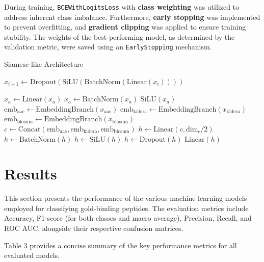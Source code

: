 \documentclass{article}
\begin{document}
During training, \texttt{BCEWithLogitsLoss} with \textbf{class weighting} was utilized to address inherent class imbalance. Furthermore, \textbf{early stopping} was implemented to prevent overfitting, and \textbf{gradient clipping} was applied to ensure training stability. The weights of the best-performing model, as determined by the validation metric, were saved using an \texttt{EarlyStopping} mechanism.

\begin{algorithm}
\caption{Siamese-like Architecture}
\begin{algorithmic}[1]
\Statex
{}
    \State $x_{i+1} \gets \text{Dropout}(\text{SiLU}(\text{BatchNorm}(\text{Linear}(x_{i}))))$
    
    \State $x_a \gets \text{Linear}(x_a)$
    \State $x_a \gets \text{BatchNorm}(x_a)$
    \State \Return $\text{SiLU}(x_a)$
\EndFunction
\Statex
{}
    \State $\text{emb}_{\text{aac}} \gets \text{EmbeddingBranch}(x_{\text{aac}})$
    \State $\text{emb}_{\text{kidera}} \gets \text{EmbeddingBranch}(x_{\text{kidera}})$
    \State $\text{emb}_{\text{blosum}} \gets \text{EmbeddingBranch}(x_{\text{blosum}})$
    \State $c \gets \text{Concat}(\text{emb}_{\text{aac}}, \text{emb}_{\text{kidera}}, \text{emb}_{\text{blosum}})$
    \State $h \gets \text{Linear}(c, \text{dim}_{c}/2)$
    \State $h \gets \text{BatchNorm}(h)$
    \State $h \gets \text{SiLU}(h)$
    \State $h \gets \text{Dropout}(h)$
    \State \Return $\text{Linear}(h)$
\EndFunction
\end{algorithmic}
\end{algorithm}

\section{Results}
This section presents the performance of the various machine learning models employed for classifying gold-binding peptides. The evaluation metrics include Accuracy, F1-score (for both classes and macro average), Precision, Recall, and ROC AUC, alongside their respective confusion matrices.

Table 3 provides a concise summary of the key performance metrics for all evaluated models.
\end{document}

